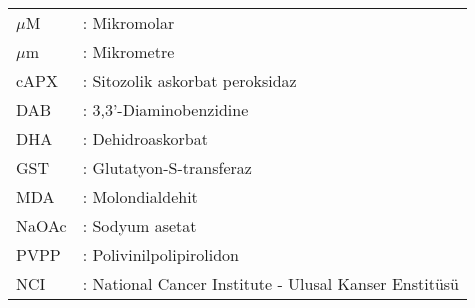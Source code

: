 \hspace{-3mm}
\begin{tabular}{p{2cm}l}

$\mu$M	&	: Mikromolar\\
$\mu$m	&	: Mikrometre\\
cAPX	&	: Sitozolik askorbat peroksidaz\\
DAB	&	: 3,3'-Diaminobenzidine\\
DHA	&	: Dehidroaskorbat\\
GST	&	: Glutatyon-S-transferaz\\
MDA	&	: Molondialdehit\\
NaOAc&	: Sodyum asetat\\
PVPP	&	: Polivinilpolipirolidon\\
NCI	&	: National Cancer Institute - Ulusal Kanser Enstitüsü\\

\end{tabular}
